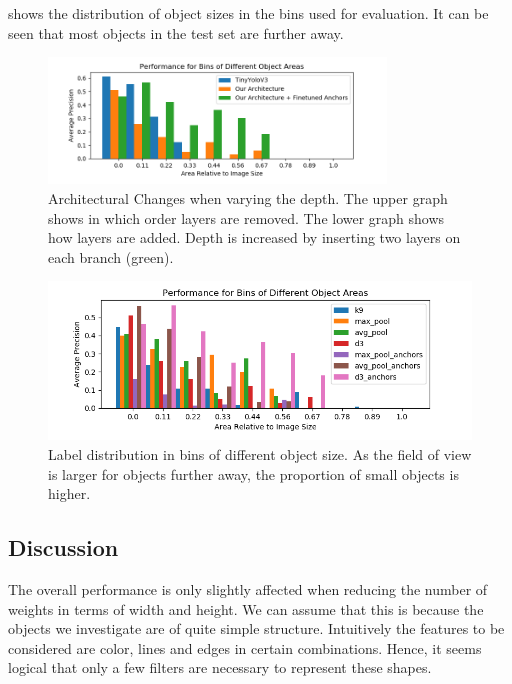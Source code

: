 	 shows the distribution of object sizes in the bins used for evaluation. It can be seen that most objects in the test set are further away. 
	
	\begin{figure}[hbtp]
		\centering
		\includegraphics[width=0.8\textwidth]{fig/hyperparam_size}
		\caption{Architectural Changes when varying the depth. The upper graph shows in which order layers are removed. The lower graph shows how layers are added. Depth is increased by inserting two layers on each branch (green). }
		\label{fig:hyp}
	\end{figure}

	\begin{figure}[hbtp]
	\centering
	\includegraphics[width=\textwidth]{fig/rf_ap_size}
	\caption{Label distribution in bins of different object size. As the field of view is larger for objects further away, the proportion of small objects is higher.}
	\label{fig:size_bins}
\end{figure}
	
	\subsection{Discussion}
	
	The overall performance is only slightly affected when reducing the number of weights in terms of width and height. We can assume that this is because the objects we investigate are of quite simple structure. Intuitively the features to be considered are color, lines and edges in certain combinations. Hence, it seems logical that only a few filters are necessary to represent these shapes.
	
